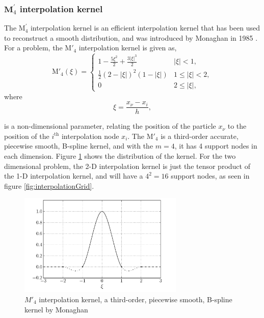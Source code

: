 \subsubsection*{$\mathbf{M}^\prime_4$ interpolation kernel}

The $\mathrm{M}^{\prime}_4$ interpolation kernel is an efficient interpolation kernel that has been used to reconstruct a smooth distribution, and was introduced by Monaghan in 1985 \cite{Monaghan1985}. For a  problem, the $\mathrm{M}'_4$ interpolation kernel is given as,
	\begin{equation}
	{\mathrm{M'}_4}\left( {\xi} \right) =
	  \begin{cases}
	   {1 - \frac{{5{\xi ^2}}}{2} + \frac{{3{{\left| \xi  \right|}^3}}}{2}} & {\left| \xi \right|} < 1, \\
	   \frac{1}{2}{\left( {2 - \left| \xi  \right|} \right)^2}\left( {1 - \left| \xi  \right|} \right) & 1 \le {\left| \xi \right|} < 2,\\
	   0 & 2 \le \left| \xi \right|,
	  \end{cases}
	\label{eq:interpKernel}
	\end{equation}
where
	\begin{equation}
	\xi = \frac{x_{\nu} - x_i}{h},
	\label{eq:xiEquation}
	\end{equation}
	
is a non-dimensional parameter, relating the position of the particle $x_{\nu}$ to the position of the $i^{\mathrm{th}}$ interpolation node $x_i$. The $\mathrm{M'}_4$ is a third-order accurate, piecewise smooth, B-spline kernel, and with the $m = 4$, it has 4 support nodes in each dimension. Figure \ref{fig:interpolationKernel} shows the distribution of the kernel. For the two dimensional problem, the 2-D interpolation kernel is just the tensor product of the 1-D interpolation kernel, and will have a $4^2 = 16$ support nodes, as seen in figure \ref{fig:interpolationGrid}.

	\begin{figure}[t]
	\centering
	\includegraphics[width=0.7\textwidth]{figures/lagrangian/interpolationKernel.pdf}
	\caption{$M'_4$ interpolation kernel, a third-order, piecewise smooth, B-spline kernel by Monaghan \cite{Monaghan1985}}
	\label{fig:interpolationKernel}
	\end{figure}

